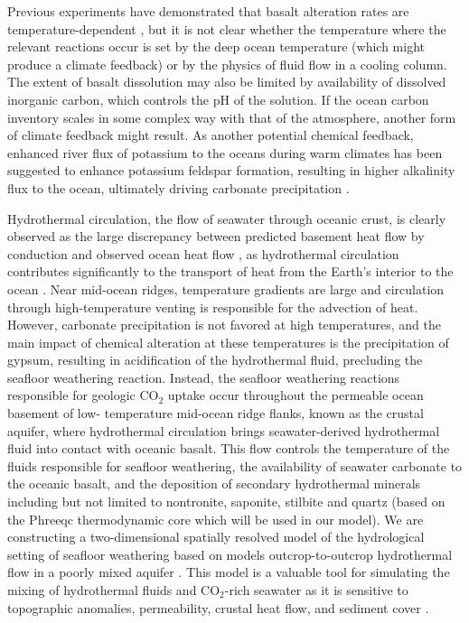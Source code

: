 \documentclass[authoryear,round,12pt]{article}
\begin{document}
Previous experiments have demonstrated that basalt
alteration rates are temperature-dependent \citep{gislason1993,
  oelkers2001, gislason2003, dessert2003}, but it is not clear whether
the temperature where the relevant reactions occur is set by the deep
ocean temperature (which might produce a climate feedback) or
by the physics of fluid flow in a cooling column. The extent of basalt dissolution may 
also be limited by availability of dissolved inorganic carbon, which controls the pH 
of the solution.  If the ocean carbon inventory scales in some complex way with that
 of the atmosphere, another form of climate feedback might result.  
As another potential chemical feedback, enhanced river flux of potassium to the oceans
 during warm climates has been suggested to enhance potassium feldspar formation,
resulting in higher alkalinity flux to the ocean, ultimately driving
carbonate precipitation \citep{coogan2013}.

Hydrothermal circulation, the flow of seawater through oceanic crust, 
is clearly observed as the large discrepancy between predicted basement 
heat flow by conduction and observed ocean heat flow \citep{stein1994}, as 
hydrothermal circulation contributes significantly to the transport of heat 
from the Earth's interior to the ocean \citep{lister1980, sclater1980}. 
Near mid-ocean ridges, temperature gradients are large and circulation
through high-temperature venting is responsible for the advection of
heat. However, carbonate precipitation is not favored at high temperatures, and 
the main impact of chemical alteration at these temperatures is the precipitation of 
gypsum, resulting in acidification of the hydrothermal fluid, precluding the seafloor 
weathering reaction. Instead, the seafloor weathering reactions responsible for 
geologic CO$_2$ uptake occur throughout the permeable ocean basement of low-
temperature mid-ocean ridge flanks, known as the crustal aquifer, where hydrothermal 
circulation brings seawater-derived hydrothermal fluid into contact with oceanic basalt. 
This flow controls the temperature of the fluids responsible for seafloor 
weathering, the availability of seawater carbonate to the oceanic basalt, and 
the deposition of secondary hydrothermal minerals including but not limited to 
nontronite, saponite, stilbite and quartz (based on the Phreeqc thermodynamic core 
which will be used in our model). We are constructing a two-dimensional spatially 
resolved model of the hydrological setting of seafloor weathering based on models  
outcrop-to-outcrop hydrothermal flow in a poorly mixed aquifer \citep{fisher2000, 
anderson2012, anderson2013}. This model is a valuable tool for simulating the mixing of hydrothermal fluids and CO$_2$-rich seawater as it is sensitive to topographic 
anomalies, permeability, crustal heat flow, and sediment cover \citep{wang1996, 
miller2004}.
\end{document}
